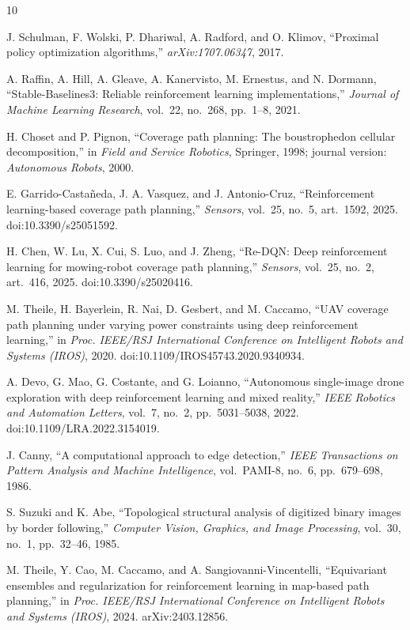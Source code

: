 \documentclass[conference]{IEEEtran}
\begin{document}
\begin{thebibliography}{10}

 J. Schulman, F. Wolski, P. Dhariwal, A. Radford, and O. Klimov, ``Proximal policy optimization algorithms,'' \emph{arXiv:1707.06347}, 2017.

 A. Raffin, A. Hill, A. Gleave, A. Kanervisto, M. Ernestus, and N. Dormann, ``Stable-Baselines3: Reliable reinforcement learning implementations,'' \emph{Journal of Machine Learning Research}, vol.~22, no.~268, pp.~1--8, 2021.

 H. Choset and P. Pignon, ``Coverage path planning: The boustrophedon cellular decomposition,'' in \emph{Field and Service Robotics}, Springer, 1998; journal version: \emph{Autonomous Robots}, 2000.

 E. Garrido-Casta\~neda, J. A. Vasquez, and J. Antonio-Cruz, ``Reinforcement learning-based coverage path planning,'' \emph{Sensors}, vol.~25, no.~5, art.~1592, 2025. doi:10.3390/s25051592.

 H. Chen, W. Lu, X. Cui, S. Luo, and J. Zheng, ``Re-DQN: Deep reinforcement learning for mowing-robot coverage path planning,'' \emph{Sensors}, vol.~25, no.~2, art.~416, 2025. doi:10.3390/s25020416.

 M. Theile, H. Bayerlein, R. Nai, D. Gesbert, and M. Caccamo, ``UAV coverage path planning under varying power constraints using deep reinforcement learning,'' in \emph{Proc. IEEE/RSJ International Conference on Intelligent Robots and Systems (IROS)}, 2020. doi:10.1109/IROS45743.2020.9340934.

 A. Devo, G. Mao, G. Costante, and G. Loianno, ``Autonomous single-image drone exploration with deep reinforcement learning and mixed reality,'' \emph{IEEE Robotics and Automation Letters}, vol.~7, no.~2, pp.~5031--5038, 2022. doi:10.1109/LRA.2022.3154019.

 J. Canny, ``A computational approach to edge detection,'' \emph{IEEE Transactions on Pattern Analysis and Machine Intelligence}, vol.~PAMI-8, no.~6, pp.~679--698, 1986.

 S. Suzuki and K. Abe, ``Topological structural analysis of digitized binary images by border following,'' \emph{Computer Vision, Graphics, and Image Processing}, vol.~30, no.~1, pp.~32--46, 1985.

 M. Theile, Y. Cao, M. Caccamo, and A. Sangiovanni-Vincentelli, ``Equivariant ensembles and regularization for reinforcement learning in map-based path planning,'' in \emph{Proc. IEEE/RSJ International Conference on Intelligent Robots and Systems (IROS)}, 2024. arXiv:2403.12856.

\end{thebibliography}
\end{document}
